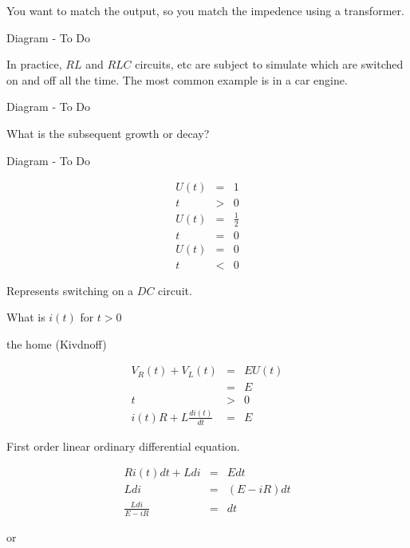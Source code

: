 \documentclass[a4paper,12pt]{article}
\begin{document}
You want to match the output, so you match the impedence using a
transformer.

\begin{table}[hbtp]

Diagram - To Do

\end{table}

In practice, $RL$ and $RLC$ circuits, etc are subject to simulate which
are switched on and off all the time. The most common example is in a
car engine.

\begin{table}[hbtp]

Diagram - To Do

\end{table}

What is the subsequent growth or decay?

\begin{table}[hbtp]

Diagram - To Do

\end{table}

\begin{eqnarray*}
U(t) & = & 1 \\
t &> & 0 \\
U(t) & = & \frac{1}{2} \\
t & = & 0 \\
U(t) & = & 0 \\
t & < & 0
\end{eqnarray*}

Represents switching on a $DC$ circuit.

What is $i(t)$ for $t > 0$

the home (Kivdnoff)

\begin{eqnarray*}
V_{R}(t) + V_{L}(t) & = & E U(t) \\
						  & = & E \\
t & > & 0 \\
i(t) R + L \frac{di(t)}{dt} & = & E
\end{eqnarray*}

First order linear ordinary differential equation.

\begin{eqnarray*}
R i(t) dt + L di & = & E dt \\
L di & = & (E - iR) dt \\
\frac{L di}{E - iR} & = & dt
\end{eqnarray*}

or
\end{document}
